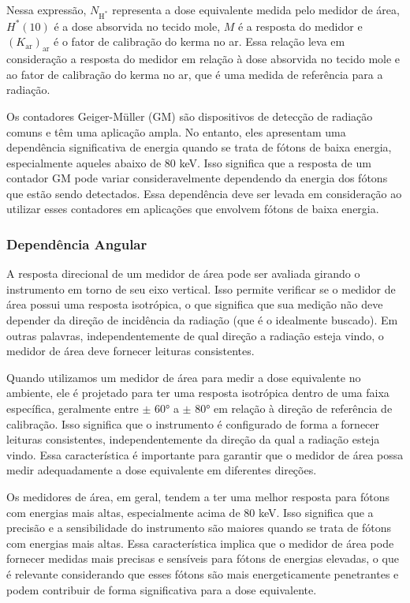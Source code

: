 \documentclass[11pt,a4paper]{article}
\begin{document}
	Nessa expressão, $N_{\text{H}^{\ast}}$ representa a dose equivalente medida pelo medidor de área, $H^{\ast}(10)$ é a dose absorvida no tecido mole, $M$ é a resposta do medidor e $(K_{\text{ar}})_{\text{ar}}$ é o fator de calibração do kerma no ar. Essa relação leva em consideração a resposta do medidor em relação à dose absorvida no tecido mole e ao fator de calibração do kerma no ar, que é uma medida de referência para a radiação.

	Os contadores Geiger-Müller (GM) são dispositivos de detecção de radiação comuns e têm uma aplicação ampla. No entanto, eles apresentam uma dependência significativa de energia quando se trata de fótons de baixa energia, especialmente aqueles abaixo de 80 keV. Isso significa que a resposta de um contador GM pode variar consideravelmente dependendo da energia dos fótons que estão sendo detectados. Essa dependência deve ser levada em consideração ao utilizar esses contadores em aplicações que envolvem fótons de baixa energia.

\subsubsection*{Dependência Angular}

	A resposta direcional de um medidor de área pode ser avaliada girando o instrumento em torno de seu eixo vertical. Isso permite verificar se o medidor de área possui uma resposta isotrópica, o que significa que sua medição não deve depender da direção de incidência da radiação (que é o idealmente buscado). Em outras palavras, independentemente de qual direção a radiação esteja vindo, o medidor de área deve fornecer leituras consistentes.

	Quando utilizamos um medidor de área para medir a dose equivalente no ambiente, ele é projetado para ter uma resposta isotrópica dentro de uma faixa específica, geralmente entre $\pm$ \ang{60} a $\pm$ \ang{80} em relação à direção de referência de calibração. Isso significa que o instrumento é configurado de forma a fornecer leituras consistentes, independentemente da direção da qual a radiação esteja vindo. Essa característica é importante para garantir que o medidor de área possa medir adequadamente a dose equivalente em diferentes direções.

	Os medidores de área, em geral, tendem a ter uma melhor resposta para fótons com energias mais altas, especialmente acima de 80 keV. Isso significa que a precisão e a sensibilidade do instrumento são maiores quando se trata de fótons com energias mais altas. Essa característica implica que o medidor de área pode fornecer medidas mais precisas e sensíveis para fótons de energias elevadas, o que é relevante considerando que esses fótons são mais energeticamente penetrantes e podem contribuir de forma significativa para a dose equivalente.
\end{document}
